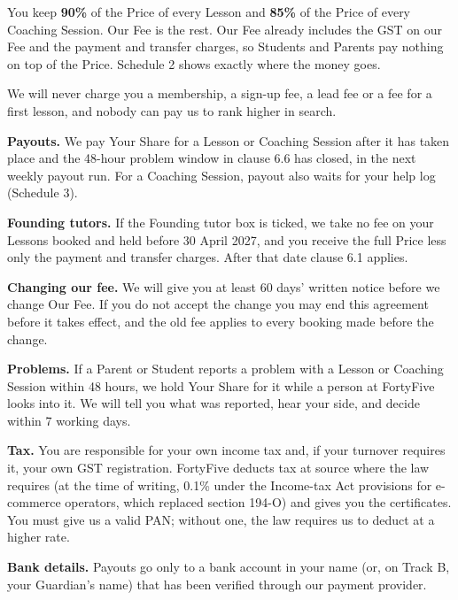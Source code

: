 \documentclass[11pt]{article}
\begin{document}
\begin{clauses}
  \item You keep \textbf{90\%} of the Price of every Lesson and \textbf{85\%} of the Price of every Coaching Session. Our Fee is the rest. Our Fee already includes the GST on our Fee and the payment and transfer charges, so Students and Parents pay nothing on top of the Price. Schedule 2 shows exactly where the money goes.
  \item We will never charge you a membership, a sign-up fee, a lead fee or a fee for a first lesson, and nobody can pay us to rank higher in search.
  \item \textbf{Payouts.} We pay Your Share for a Lesson or Coaching Session after it has taken place and the 48-hour problem window in clause 6.6 has closed, in the next weekly payout run. For a Coaching Session, payout also waits for your help log (Schedule 3).
  \item \textbf{Founding tutors.} If the Founding tutor box is ticked, we take no fee on your Lessons booked and held before 30 April 2027, and you receive the full Price less only the payment and transfer charges. After that date clause 6.1 applies.
  \item \textbf{Changing our fee.} We will give you at least 60 days' written notice before we change Our Fee. If you do not accept the change you may end this agreement before it takes effect, and the old fee applies to every booking made before the change.
  \item \textbf{Problems.} If a Parent or Student reports a problem with a Lesson or Coaching Session within 48 hours, we hold Your Share for it while a person at FortyFive looks into it. We will tell you what was reported, hear your side, and decide within 7 working days.
  \item \textbf{Tax.} You are responsible for your own income tax and, if your turnover requires it, your own GST registration. FortyFive deducts tax at source where the law requires (at the time of writing, 0.1\% under the Income-tax Act provisions for e-commerce operators, which replaced section 194-O) and gives you the certificates. You must give us a valid PAN; without one, the law requires us to deduct at a higher rate.
  \item \textbf{Bank details.} Payouts go only to a bank account in your name (or, on Track B, your Guardian's name) that has been verified through our payment provider.
\end{clauses}

\end{document}

